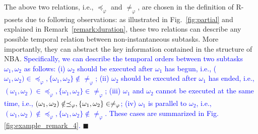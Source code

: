 \begin{remark}\label{remark:partial-order-motivation}
The above two relations, i.e., $\preceq_\varphi$ and $\neq_\varphi$,
are chosen in the definition of R-posets due to following observations:
as illustrated in Fig.~\ref{fig:partial} and explained in Remark~\ref{remark:duration},
these two relations can describe any possible temporal relation
between non-instantaneous subtasks.
More importantly,
they can abstract the key information contained in the structure of NBA.
\textcolor{blue}{Specifically, we can describe the temporal orders between two subtasks $\omega_1,\omega_2$ as follows:
(i) $\omega_2$ should be executed after $\omega_1$ has begun, i.e., ($\omega_1,\omega_2)\in\preceq_{\varphi},\{\omega_1,\omega_2\}\notin\neq_\varphi$;
(ii) $\omega_2$ should be executed after $\omega_1$ has ended, i.e.,
$(\omega_1,\omega_2)\in\preceq_{\varphi}, \{\omega_1,\omega_2\}\in\neq_\varphi$;
(iii) $\omega_1$ and $\omega_2$ cannot be executed at the same time,
i.e., $(\omega_1,\omega_2)\\\notin\preceq_\varphi,\{\omega_1,\omega_2\}\in\neq_\varphi$;
(iv) $\omega_1$ is parallel to $\omega_2$, i.e., $(\omega_1,\omega_2)\notin\preceq_\varphi,
\{\omega_1,\omega_2\}\notin\neq_\varphi$.
These cases are summarized in Fig. \ref{fig:example_remark_4}.}
\hfill $\blacksquare$
\end{remark}


